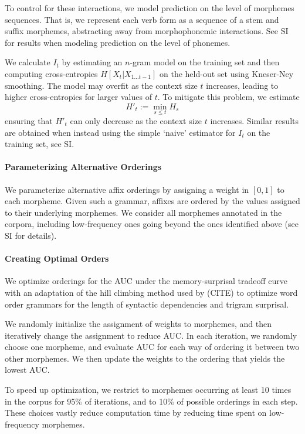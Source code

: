 To control for these interactions, we model prediction on the level of morphemes sequences.
That is, we represent each verb form as a sequence of a stem and suffix morphemes, abstracting away from morphophonemic interactions.
See SI for results when modeling prediction on the level of phonemes.

We calculate $I_t$ by estimating an $n$-gram model on the training set and then computing cross-entropies $H[X_t|X_{1\dots t-1}]$ on the held-out set using Kneser-Ney smoothing.
The model may overfit as the context size $t$ increases, leading to higher cross-entropies for larger values of $t$.
To mitigate this problem, we estimate
\begin{equation}
H'_t := \min_{s \leq t} H_s    
\end{equation}
ensuring that $H'_t$ can only decrease as the context size $t$ increases.
Similar results are obtained when instead using the simple `naive' estimator for $I_t$ on the training set, see SI.

\paragraph{Parameterizing Alternative Orderings}

We parameterize alternative affix orderings by assigning a weight in $[0,1]$ to each morpheme.
Given such a grammar, affixes are ordered by the values assigned to their underlying morphemes.
We consider all morphemes annotated in the corpora, including low-frequency ones going beyond the ones identified above (see SI for details).



\paragraph{Creating Optimal Orders}

We optimize orderings for the AUC under the memory-surprisal tradeoff curve with an adaptation of the hill climbing method used by (CITE) to optimize word order grammars for the length of syntactic dependencies and trigram surprisal.

We randomly initialize the assignment of weights to morphemes, and then iteratively change the assignment to reduce AUC.
In each iteration, we randomly choose one morpheme, and evaluate AUC for each way of ordering it between two other morphemes.
We then update the weights to the ordering that yields the lowest AUC.

To speed up optimization, we restrict to morphemes occurring at least 10 times in the corpus for 95\% of iterations, and to 10\% of possible orderings in each step.
These choices vastly reduce computation time by reducing time spent on low-frequency morphemes.

